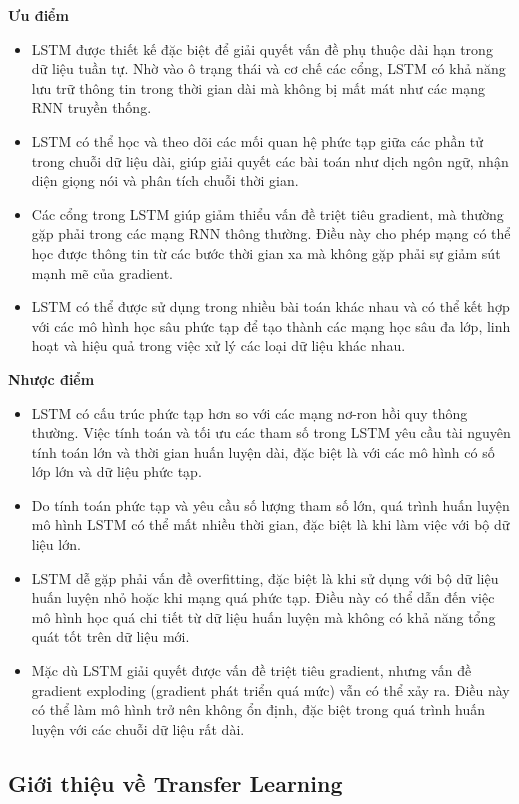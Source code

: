 \textbf{Ưu điểm}
\begin{itemize}
    \item LSTM được thiết kế đặc biệt để giải quyết vấn đề phụ thuộc dài hạn trong dữ liệu tuần tự. Nhờ vào ô trạng thái và cơ chế các cổng, LSTM có khả năng lưu trữ thông tin trong thời gian dài mà không bị mất mát như các mạng RNN truyền thống.
    \item LSTM có thể học và theo dõi các mối quan hệ phức tạp giữa các phần tử trong chuỗi dữ liệu dài, giúp giải quyết các bài toán như dịch ngôn ngữ, nhận diện giọng nói và phân tích chuỗi thời gian.
    \item Các cổng trong LSTM giúp giảm thiểu vấn đề triệt tiêu gradient, mà thường gặp phải trong các mạng RNN thông thường. Điều này cho phép mạng có thể học được thông tin từ các bước thời gian xa mà không gặp phải sự giảm sút mạnh mẽ của gradient.
    \item LSTM có thể được sử dụng trong nhiều bài toán khác nhau và có thể kết hợp với các mô hình học sâu phức tạp để tạo thành các mạng học sâu đa lớp, linh hoạt và hiệu quả trong việc xử lý các loại dữ liệu khác nhau.
\end{itemize}
\textbf{Nhược điểm}
\begin{itemize}
    \item LSTM có cấu trúc phức tạp hơn so với các mạng nơ-ron hồi quy thông thường. Việc tính toán và tối ưu các tham số trong LSTM yêu cầu tài nguyên tính toán lớn và thời gian huấn luyện dài, đặc biệt là với các mô hình có số lớp lớn và dữ liệu phức tạp.
    \item Do tính toán phức tạp và yêu cầu số lượng tham số lớn, quá trình huấn luyện mô hình LSTM có thể mất nhiều thời gian, đặc biệt là khi làm việc với bộ dữ liệu lớn.
    \item LSTM dễ gặp phải vấn đề overfitting, đặc biệt là khi sử dụng với bộ dữ liệu huấn luyện nhỏ hoặc khi mạng quá phức tạp. Điều này có thể dẫn đến việc mô hình học quá chi tiết từ dữ liệu huấn luyện mà không có khả năng tổng quát tốt trên dữ liệu mới.
    \item Mặc dù LSTM giải quyết được vấn đề triệt tiêu gradient, nhưng vấn đề gradient exploding (gradient phát triển quá mức) vẫn có thể xảy ra. Điều này có thể làm mô hình trở nên không ổn định, đặc biệt trong quá trình huấn luyện với các chuỗi dữ liệu rất dài.
\end{itemize}

\subsection{Giới thiệu về Transfer Learning}

